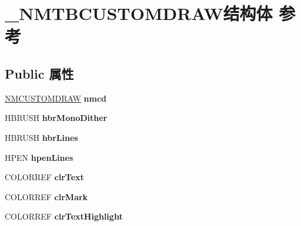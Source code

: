\hypertarget{struct___n_m_t_b_c_u_s_t_o_m_d_r_a_w}{}\section{\+\_\+\+N\+M\+T\+B\+C\+U\+S\+T\+O\+M\+D\+R\+A\+W结构体 参考}
\label{struct___n_m_t_b_c_u_s_t_o_m_d_r_a_w}
\subsection*{Public 属性}
\begin{DoxyCompactItemize}
\item 
\mbox{\label{struct___n_m_t_b_c_u_s_t_o_m_d_r_a_w_a0478920fdca7a6111d6a88115123338d}} 
\hyperlink{structtag_n_m_c_u_s_t_o_m_d_r_a_w_i_n_f_o}{N\+M\+C\+U\+S\+T\+O\+M\+D\+R\+AW} {\bfseries nmcd}
\item 
\mbox{\label{struct___n_m_t_b_c_u_s_t_o_m_d_r_a_w_a6634e400f46ab61a0da84b5ed042d5ae}} 
H\+B\+R\+U\+SH {\bfseries hbr\+Mono\+Dither}
\item 
\mbox{\label{struct___n_m_t_b_c_u_s_t_o_m_d_r_a_w_a262c55e22629307615bb3c16223b705a}} 
H\+B\+R\+U\+SH {\bfseries hbr\+Lines}
\item 
\mbox{\label{struct___n_m_t_b_c_u_s_t_o_m_d_r_a_w_a3ec060188db32a243609d64047578a7f}} 
H\+P\+EN {\bfseries hpen\+Lines}
\item 
\mbox{\label{struct___n_m_t_b_c_u_s_t_o_m_d_r_a_w_a72fcbc20e9d394e7decd4205607a86f4}} 
C\+O\+L\+O\+R\+R\+EF {\bfseries clr\+Text}
\item 
\mbox{\label{struct___n_m_t_b_c_u_s_t_o_m_d_r_a_w_a95c2bcb0e1338ad5ce16ad6c64705dde}} 
C\+O\+L\+O\+R\+R\+EF {\bfseries clr\+Mark}
\item 
\mbox{\label{struct___n_m_t_b_c_u_s_t_o_m_d_r_a_w_aeeb1bb8e67e5302b97209f7f8710be8e}} 
C\+O\+L\+O\+R\+R\+EF {\bfseries clr\+Text\+Highlight}
\item 

\end{DoxyCompactItemize}
